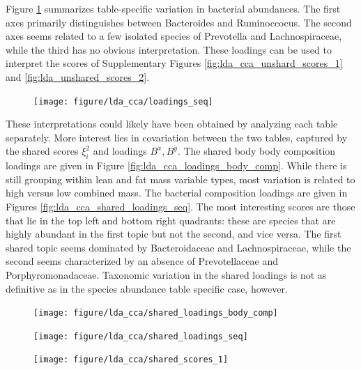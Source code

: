 \documentclass{article}
\begin{document}
Figure \ref{fig:lda_cca_loadings_seq} summarizes table-specific variation in
bacterial abundances. The first axes primarily distinguishes between Bacteroides
and Ruminoccocus. The second axes seems related to a few isolated species of
Prevotella and Lachnospiraceae, while the third has no obvious interpretation.
These loadings can be used to interpret the scores of Supplementary Figures
\ref{fig:lda_cca_unshard_scores_1} and \ref{fig:lda_unshared_scores_2}.

\begin{figure}[ht]
  \centering
  \texttt{[image: figure/lda\_cca/loadings\_seq]}
  \caption{\label{fig:lda_cca_loadings_seq} }
\end{figure}

These interpretations could likely have been obtained by analyzing each table
separately. More interest lies in covariation between the two tables, captured
by the shared scores $\xi_{i}^{2}$ and loadings $B^{x}, B^{y}$. The shared body
body composition loadings are given in Figure
\ref{fig:lda_cca_loadings_body_comp}. While there is still grouping within lean
and fat mass variable types, most variation is related to high versus low
combined mass. The bacterial composition loadings are given in Figures
\ref{fig:lda_cca_shared_loadings_seq}. The most interesting scores are those
that lie in the top left and bottom right quadrants: these are species that are
highly abundant in the first topic but not the second, and vice versa. The first
shared topic seems dominated by Bacteroidaceae and Lachnospiraceae, while the
second seems characterized by an absence of Prevotellaceae and
Porphyromonadaceae. Taxonomic variation in the shared loadings is not as
definitive as in the species abundance table specific case, however.

\begin{figure}[ht]
  \centering
  \texttt{[image: figure/lda\_cca/shared\_loadings\_body\_comp]}
  \caption{\label{fig:lda_cca_shared_loadings_body_comp} }
\end{figure}

\begin{figure}[ht]
  \centering
  \texttt{[image: figure/lda\_cca/shared\_loadings\_seq]}
  \caption{\label{fig:lda_ca_shared_loadings_seq} }
\end{figure}

\begin{figure}[ht]
  \centering
  \texttt{[image: figure/lda\_cca/shared\_scores\_1]}
  \caption{\label{fig:lda_cca_shared_scores_1} }
\end{figure}
\end{document}
